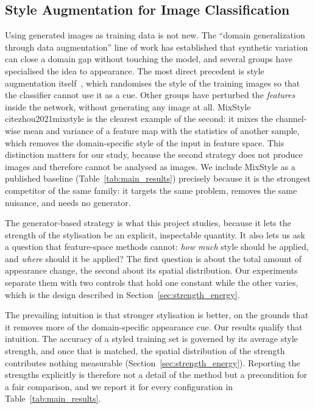 \subsection{Style Augmentation for Image Classification}
\label{sec:style_aug_classification}

Using generated images as training data is not new. The ``domain
generalization through data augmentation'' line of work
\cite{zhou2023dgsurvey} has established that synthetic variation can close a
domain gap without touching the model, and several groups have
specialised the idea to appearance. The most direct precedent is style
augmentation itself~\cite{jackson2019style}, which randomises the style of
the training images so that the classifier cannot use it as a cue. Other
groups have perturbed the \emph{features} inside the network, without
generating any image at all. MixStyle~\\cite{zhou2021mixstyle} is the clearest
example of the second: it mixes the channel-wise mean and variance of a
feature map with the statistics of another sample, which removes the
domain-specific style of the input in feature space. This distinction
matters for our study, because the second strategy does not produce images
and therefore cannot be analysed as images. We include MixStyle as a
published baseline (Table~\ref{tab:main_results}) precisely because it is
the strongest competitor of the same family: it targets the same problem,
removes the same nuisance, and needs no generator.

The generator-based strategy is what this project studies, because it lets
the strength of the stylisation be an explicit, inspectable quantity. It
also lets us ask a question that feature-space methods cannot: \emph{how
much} style should be applied, and \emph{where} should it be applied? The
first question is about the total amount of appearance change, the second
about its spatial distribution. Our experiments separate them with two
controls that hold one constant while the other varies, which is the design
described in Section~\ref{sec:strength_energy}.

The prevailing intuition is that stronger stylisation is better, on the
grounds that it removes more of the domain-specific appearance cue. Our
results qualify that intuition. The accuracy of a styled training set is
governed by its average style strength, and once that is matched, the
spatial distribution of the strength contributes nothing measurable
(Section~\ref{sec:strength_energy}). Reporting the strengths explicitly
is therefore not a detail of the method but a precondition for a fair
comparison, and we report it for every configuration in
Table~\ref{tab:main_results}.
